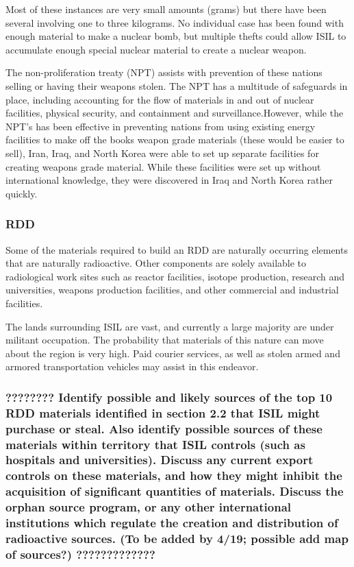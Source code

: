 \documentclass{report}
\begin{document}
Most of these instances are very small amounts (grams) but there have been several involving one to three kilograms. No individual case has been found with enough material to make a nuclear bomb, but multiple thefts could allow ISIL to accumulate enough special nuclear material to create a nuclear weapon. 

The non-proliferation treaty (NPT) assists with prevention of these nations selling or having their weapons stolen. The NPT has a multitude of safeguards in place, including accounting for the flow of materials in and out of nuclear facilities, physical security, and containment and surveillance.However, while the NPT's has been effective in preventing nations from using existing energy facilities to make off the books weapon grade materials (these would be easier to sell), Iran, Iraq, and North Korea were able to set up separate facilities for creating weapons grade material. While these facilities were set up without international knowledge, they were discovered in Iraq and North Korea rather quickly.


\subsubsection{RDD}
 Some of the materials required to build an RDD are naturally occurring elements that are naturally radioactive. Other components are solely available to radiological work sites such as reactor facilities, isotope production, research and universities, weapons production facilities, and other commercial and industrial facilities. 

The lands surrounding ISIL are vast, and currently a large majority are under militant occupation.  The probability that materials of this nature can move about the region is very high.  Paid courier services, as well as stolen armed and armored transportation vehicles  may assist in this endeavor.

\subsubsection{???????? Identify possible and likely sources of the top 10 RDD materials identified in section 2.2 that ISIL might purchase or steal. Also identify possible sources of these materials within territory that ISIL controls (such as hospitals and universities). Discuss any current export controls on these materials, and how they might inhibit the acquisition of significant quantities of materials. Discuss the orphan source program, or any other international institutions which regulate the creation and distribution of radioactive sources. (To be added by 4/19; possible add map of sources?) ?????????????} 
\end{document}
